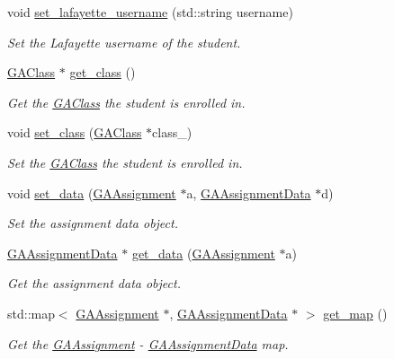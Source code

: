 \begin{DoxyCompactItemize}
void \hyperlink{class_g_a_student_a996265e95742082a4f762b2fe6022c65}{set\+\_\+lafayette\+\_\+username} (std\+::string username)
\begin{DoxyCompactList}\small\item\em Set the Lafayette username of the student. \end{DoxyCompactList}\item 
\hyperlink{class_g_a_class}{G\+A\+Class} $\ast$ \hyperlink{class_g_a_student_ad0cdfa58f5b581d0e5d671e402dc7127}{get\+\_\+class} ()
\begin{DoxyCompactList}\small\item\em Get the \hyperlink{class_g_a_class}{G\+A\+Class} the student is enrolled in. \end{DoxyCompactList}\item 
void \hyperlink{class_g_a_student_a032086c71e6852d47c3204c10ac481e3}{set\+\_\+class} (\hyperlink{class_g_a_class}{G\+A\+Class} $\ast$class\+\_\+)
\begin{DoxyCompactList}\small\item\em Set the \hyperlink{class_g_a_class}{G\+A\+Class} the student is enrolled in. \end{DoxyCompactList}\item 
void \hyperlink{class_g_a_student_a4cc7c39cf2d032023e6cd5e6313152c7}{set\+\_\+data} (\hyperlink{class_g_a_assignment}{G\+A\+Assignment} $\ast$a, \hyperlink{class_g_a_assignment_data}{G\+A\+Assignment\+Data} $\ast$d)
\begin{DoxyCompactList}\small\item\em Set the assignment data object. \end{DoxyCompactList}\item 
\hyperlink{class_g_a_assignment_data}{G\+A\+Assignment\+Data} $\ast$ \hyperlink{class_g_a_student_a95bb10e02192cd098323b313a4155827}{get\+\_\+data} (\hyperlink{class_g_a_assignment}{G\+A\+Assignment} $\ast$a)
\begin{DoxyCompactList}\small\item\em Get the assignment data object. \end{DoxyCompactList}\item 
std\+::map$<$ \hyperlink{class_g_a_assignment}{G\+A\+Assignment} $\ast$, \hyperlink{class_g_a_assignment_data}{G\+A\+Assignment\+Data} $\ast$ $>$ \hyperlink{class_g_a_student_a967fe8dc4aac505d1a6dbc8535736681}{get\+\_\+map} ()
\begin{DoxyCompactList}\small\item\em Get the \hyperlink{class_g_a_assignment}{G\+A\+Assignment} -\/ \hyperlink{class_g_a_assignment_data}{G\+A\+Assignment\+Data} map. \end{DoxyCompactList}\item 

\end{DoxyCompactItemize}
